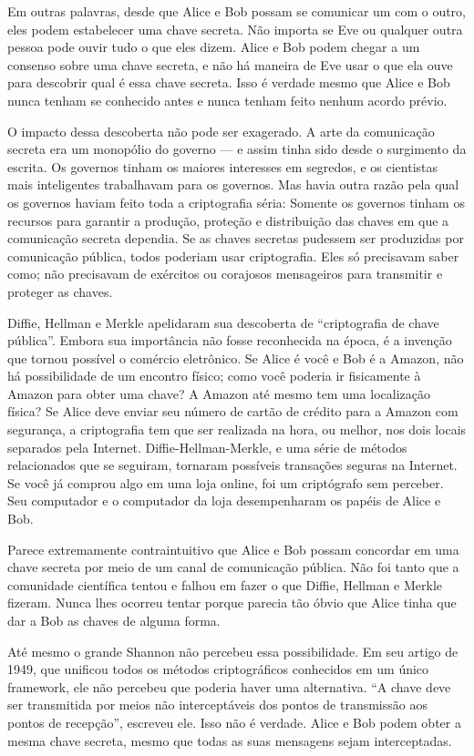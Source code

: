 \documentclass{book}
\begin{document}
Em outras palavras, desde que Alice e Bob possam se comunicar um com o outro, eles podem estabelecer uma chave secreta. Não importa se Eve ou qualquer outra pessoa pode ouvir tudo o que eles dizem. Alice e Bob podem chegar a um consenso sobre uma chave secreta, e não há maneira de Eve usar o que ela ouve para descobrir qual é essa chave secreta. Isso é verdade mesmo que Alice e Bob nunca tenham se conhecido antes e nunca tenham feito nenhum acordo prévio.

O impacto dessa descoberta não pode ser exagerado. A arte da comunicação secreta era um monopólio do governo --- e assim tinha sido desde o surgimento da escrita. Os governos tinham os maiores interesses em segredos, e os cientistas mais inteligentes trabalhavam para os governos. Mas havia outra razão pela qual os governos haviam feito toda a criptografia séria: Somente os governos tinham os recursos para garantir a produção, proteção e distribuição das chaves em que a comunicação secreta dependia. Se as chaves secretas pudessem ser produzidas por comunicação pública, todos poderiam usar criptografia. Eles só precisavam saber como; não precisavam de exércitos ou corajosos mensageiros para transmitir e proteger as chaves.

Diffie, Hellman e Merkle apelidaram sua descoberta de ``criptografia de chave pública''. Embora sua importância não fosse reconhecida na época, é a invenção que tornou possível o comércio eletrônico. Se Alice é você e Bob é a Amazon, não há possibilidade de um encontro físico; como você poderia ir fisicamente à Amazon para obter uma chave? A Amazon até mesmo tem uma localização física? Se Alice deve enviar seu número de cartão de crédito para a Amazon com segurança, a criptografia tem que ser realizada na hora, ou melhor, nos dois locais separados pela Internet. Diffie-Hellman-Merkle, e uma série de métodos relacionados que se seguiram, tornaram possíveis transações seguras na Internet. Se você já comprou algo em uma loja online, foi um criptógrafo sem perceber. Seu computador e o computador da loja desempenharam os papéis de Alice e Bob.

Parece extremamente contraintuitivo que Alice e Bob possam concordar em uma chave secreta por meio de um canal de comunicação pública. Não foi tanto que a comunidade científica tentou e falhou em fazer o que Diffie, Hellman e Merkle fizeram. Nunca lhes ocorreu tentar porque parecia tão óbvio que Alice tinha que dar a Bob as chaves de alguma forma.

Até mesmo o grande Shannon não percebeu essa possibilidade. Em seu artigo de 1949, que unificou todos os métodos criptográficos conhecidos em um único framework, ele não percebeu que poderia haver uma alternativa. ``A chave deve ser transmitida por meios não interceptáveis dos pontos de transmissão aos pontos de recepção'', escreveu ele. Isso não é verdade. Alice e Bob podem obter a mesma chave secreta, mesmo que todas as suas mensagens sejam interceptadas.
\end{document}
